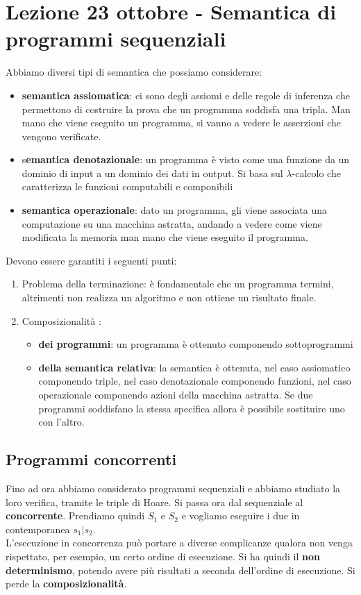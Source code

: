 \section{Lezione 23 ottobre - Semantica di programmi sequenziali}
Abbiamo diversi tipi di semantica che possiamo considerare:
\begin{itemize}
    \item \textbf{semantica assiomatica}: ci sono degli assiomi e delle regole di inferenza che permettono di costruire la prova che un programma soddisfa una tripla. Man mano che viene eseguito un programma, si vanno a vedere le asserzioni che vengono verificate. 
    \item s\textbf{emantica denotazionale}: un programma è visto come una funzione da un dominio di input a un dominio dei dati in output. Si basa sul $\lambda$-calcolo che caratterizza le funzioni computabili e componibili
    \item \textbf{semantica operazionale}: dato un programma, gli viene associata una computazione su una macchina astratta, andando a vedere come viene modificata la memoria man mano che viene eseguito il programma. 
\end{itemize}
Devono essere garantiti i seguenti punti:
\begin{enumerate}
    \item Problema della terminazione: è fondamentale che un programma termini, altrimenti non realizza un algoritmo e non ottiene un risultato finale.
    \item Composizionalità :\begin{itemize}
        \item \textbf{dei programmi}: un programma è ottenuto componendo sottoprogrammi
        \item \textbf{della semantica relativa}: la semantica è ottenuta, nel caso assiomatico componendo triple, nel caso denotazionale componendo funzioni, nel caso operazionale componendo azioni della macchina astratta. Se due programmi soddisfano la stessa specifica allora è possibile sostituire uno con l’altro.
    \end{itemize}
\end{enumerate}
\subsection{Programmi concorrenti}
Fino ad ora abbiamo considerato programmi sequenziali e abbiamo studiato la loro verifica, tramite le triple di Hoare. Si passa ora dal sequenziale al \textbf{concorrente}. Prendiamo quindi $S_1$ e $S_2$ e vogliamo eseguire i due in contemporanea  $s_1|s_2$.\\ L'esecuzione in concorrenza può portare a diverse complicanze qualora non venga rispettato, per esempio, un certo ordine di esecuzione. Si ha quindi il \textbf{non determinismo}, potendo avere più risultati a seconda dell'ordine di esecuzione. Si perde la \textbf{composizionalità}.

